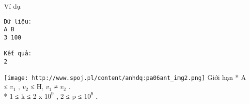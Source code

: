 Ví dụ
\begin{verbatim}
Dữ liệu:
A B
3 100

Kết quả:
2
\end{verbatim}


\texttt{[image: http://www.spoj.pl/content/anhdq:pa06ant\_img2.png]}
Giới hạn
* A ≤ $v_{1}$   , $v_{2}$   ≤ H, $v_{1}$   ≠ $v_{2}$   .   
\\   * 1 ≤ k ≤ 2 x $10^{9}$   , 2 ≤ p ≤ $10^{9}$   .   
\\